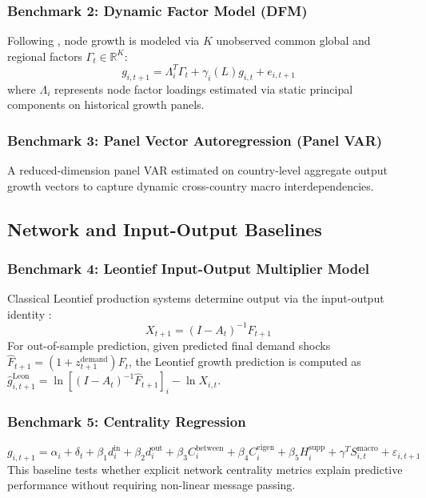 \documentclass[11pt,a4paper]{article}
\newcommand{\R}{\mathbb{R}}
\begin{document}
\subsubsection{Benchmark 2: Dynamic Factor Model (DFM)}
Following \citet{stock2002forecasting}, node growth is modeled via $K$ unobserved common global and regional factors $\Gamma_t \in \R^K$:
\begin{equation}
    g_{i,t+1} = \Lambda_i^T \Gamma_t + \gamma_i(L) g_{i,t} + e_{i,t+1}
    \label{eq:dfm}
\end{equation}
where $\Lambda_i$ represents node factor loadings estimated via static principal components on historical growth panels.

\subsubsection{Benchmark 3: Panel Vector Autoregression (Panel VAR)}
A reduced-dimension panel VAR estimated on country-level aggregate output growth vectors to capture dynamic cross-country macro interdependencies.

\subsection{Network and Input-Output Baselines}

\subsubsection{Benchmark 4: Leontief Input-Output Multiplier Model}
Classical Leontief production systems determine output via the input-output identity \citep{leontief1936quantitative}:
\begin{equation}
    X_{t+1} = (I - A_t)^{-1} F_{t+1}
    \label{eq:leontief}
\end{equation}
For out-of-sample prediction, given predicted final demand shocks $\hat{F}_{t+1} = (1 + z_{t+1}^{\text{demand}}) F_t$, the Leontief growth prediction is computed as $\hat{g}_{i,t+1}^{\text{Leon}} = \ln \left[ (I - A_t)^{-1} \hat{F}_{t+1} \right]_i - \ln X_{i,t}$.

\subsubsection{Benchmark 5: Centrality Regression}
\begin{equation}
    g_{i,t+1} = \alpha_i + \delta_t + \beta_1 d_i^{\text{in}} + \beta_2 d_i^{\text{out}} + \beta_3 C_i^{\text{between}} + \beta_4 C_i^{\text{eigen}} + \beta_5 H_i^{\text{supp}} + \gamma^T S_{i,t}^{\text{macro}} + \varepsilon_{i,t+1}
    \label{eq:centrality_reg}
\end{equation}
This baseline tests whether explicit network centrality metrics explain predictive performance without requiring non-linear message passing.
\end{document}
